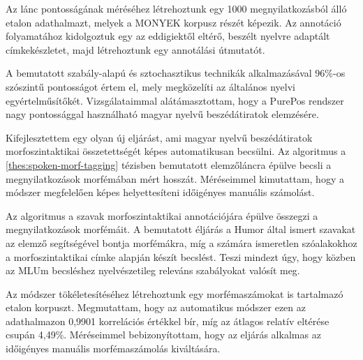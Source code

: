 Az  lánc pontosságának méréséhez létrehoztunk egy 1000 megnyilatkozásból álló etalon adathalmazt, melyek a MONYEK \cite{Matyus2014} korpusz részét képezik. 
Az annotáció folyamatához kidolgoztuk egy az eddigiektől eltérő, beszélt nyelvre adaptált címkekészletet, majd létrehoztunk egy annotálási útmutatót.

A bemutatott szabály-alapú és sztochasztikus technikák alkalmazásával 96\%-os szószintű pontosságot értem el, mely megközelíti az általános nyelvi egyértelműsítőkét.
Vizsgálataimmal alátámasztottam, hogy a PurePos rendszer nagy pontossággal használható magyar nyelvű beszédátiratok elemzésére. 


\thesisline%


\begin{core}
\begin{thesis}
\label{thes:mlu-estimation}
Kifejlesztettem egy olyan új eljárást, ami magyar nyelvű beszédátiratok morfoszintaktikai összetettségét képes automatikusan becsülni.
Az algoritmus a \ref{thes:spoken-morf-tagging} tézisben bemutatott elemzőláncra épülve becsli a megnyilatkozások morfémában mért hosszát. 
Méréseimmel kimutattam, hogy a módszer megfelelően képes helyettesíteni időigényes manuális számolást.
\end{thesis}

\begin{pub}
\cite{Matyus2014,Orosz2014c}
\end{pub}
\end{core}

Az algoritmus a szavak morfoszintaktikai annotációjára épülve összegzi a megnyilatkozások morfémáit.
A bemutatott éljárás a Humor által ismert szavakat az elemző segítségével bontja morfémákra, míg a számára ismeretlen szóalakokhoz a morfoszintaktikai címke alapján készít becslést.
Teszi mindezt úgy, hogy közben az MLUm becsléshez nyelvészetileg releváns szabályokat valósít meg.

Az módszer tökéletesítéséhez létrehoztunk egy morfémaszámokat is tartalmazó etalon korpuszt. 
Megmutattam, hogy az automatikus módszer ezen az adathalmazon 0,9901 korrelációs értékkel bír, míg az átlagos relatív eltérése csupán 4,49\%. 
Méréseimmel bebizonyítottam, hogy az eljárás alkalmas az időigényes manuális morfémaszámolás kiváltására.

